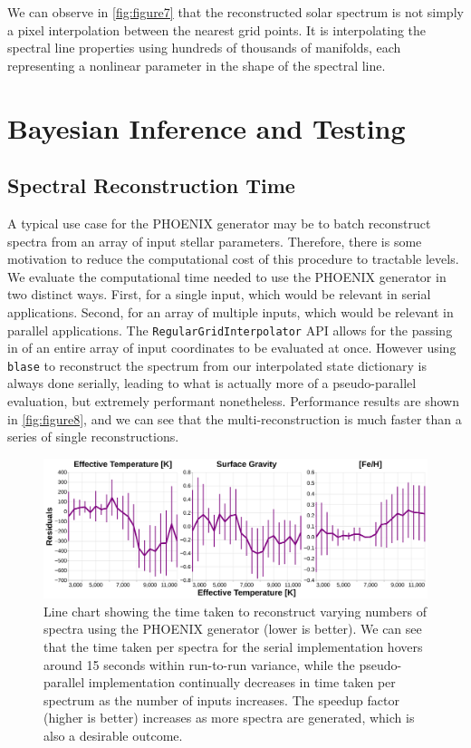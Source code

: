 \documentclass[twocolumn]{aastex631}
\begin{document}
We can observe in \autoref{fig:figure7} that the reconstructed solar spectrum is not simply a pixel interpolation between the nearest grid points.
It is interpolating the spectral line properties using hundreds of thousands of manifolds, each representing a nonlinear parameter in the shape of the spectral line.

\section{Bayesian Inference and Testing}
\subsection{Spectral Reconstruction Time}
A typical use case for the PHOENIX generator may be to batch reconstruct spectra from an array of input stellar parameters. 
Therefore, there is some motivation to reduce the computational cost of this procedure to tractable levels. 
We evaluate the computational time needed to use the PHOENIX generator in two distinct ways. 
First, for a single input, which would be relevant in serial applications. 
Second, for an array of multiple inputs, which would be relevant in parallel applications.
The \texttt{RegularGridInterpolator} API allows for the passing in of an entire array of input coordinates to be evaluated at once. 
However using \texttt{blase} to reconstruct the spectrum from our interpolated state dictionary is always done serially, leading to what is actually more of a pseudo-parallel evaluation, but extremely performant nonetheless. 
Performance results are shown in \autoref{fig:figure8}, and we can see that the multi-reconstruction is much faster than a series of single reconstructions.

\begin{figure}[t!]
    \centering
    \includegraphics[width=\columnwidth]{figure8}
    \caption{Line chart showing the time taken to reconstruct varying numbers of spectra using the PHOENIX generator (lower is better). 
    We can see that the time taken per spectra for the serial implementation hovers around 15 seconds within run-to-run variance, while the pseudo-parallel implementation continually decreases in time taken per spectrum as the number of inputs increases. 
    The speedup factor (higher is better) increases as more spectra are generated, which is also a desirable outcome.}
    \label{fig:figure8}
\end{figure}
\end{document}
